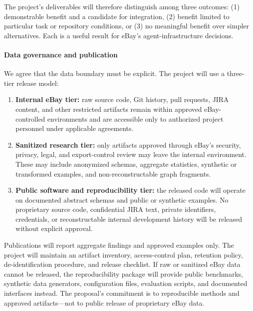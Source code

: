 \documentclass[11pt]{article}
\begin{document}
The project’s deliverables will therefore distinguish among three outcomes: (1) demonstrable benefit and a candidate for integration, (2) benefit limited to particular task or repository conditions, or (3) no meaningful benefit over simpler alternatives. Each is a useful result for eBay’s agent-infrastructure decisions.

\paragraph{Data governance and publication}
We agree that the data boundary must be explicit. The project will use a three-tier release model:

\begin{enumerate}
  \item \textbf{Internal eBay tier:} raw source code, Git history, pull requests, JIRA content, and other restricted artifacts remain within approved eBay-controlled environments and are accessible only to authorized project personnel under applicable agreements.
  \item \textbf{Sanitized research tier:} only artifacts approved through eBay’s security, privacy, legal, and export-control review may leave the internal environment. These may include anonymized schemas, aggregate statistics, synthetic or transformed examples, and non-reconstructable graph fragments.
  \item \textbf{Public software and reproducibility tier:} the released code will operate on documented abstract schemas and public or synthetic examples. No proprietary source code, confidential JIRA text, private identifiers, credentials, or reconstructable internal development history will be released without explicit approval.
\end{enumerate}

Publications will report aggregate findings and approved examples only. The project will maintain an artifact inventory, access-control plan, retention policy, de-identification procedure, and release checklist. If raw or sanitized eBay data cannot be released, the reproducibility package will provide public benchmarks, synthetic data generators, configuration files, evaluation scripts, and documented interfaces instead. The proposal’s commitment is to reproducible methods and approved artifacts---not to public release of proprietary eBay data.
\end{document}
